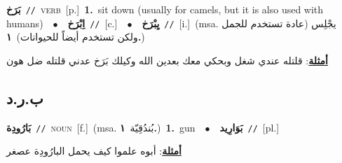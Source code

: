 \documentclass[10pt,a4paper,twoside]{article} %
\begin{document}
\begin{multicols}{2}
{\setlength\topsep{0pt}\textbf{\foreignlanguage{arabic}{بَرَخ}}\ {\color{gray}\texttt{//}\color{black}}\ \textsc{verb}\ [p.]\ \textbf{1.}~sit down (usually for camels, but it is also used with humans)\ \ $\bullet$\ \ \setlength\topsep{0pt}\textbf{\foreignlanguage{arabic}{اِبْرَخ}}\ {\color{gray}\texttt{//}\color{black}}\ [c.]\ \ $\bullet$\ \ \setlength\topsep{0pt}\textbf{\foreignlanguage{arabic}{يِبْرَخ}}\ {\color{gray}\texttt{//}\color{black}}\ [i.]\ \color{gray}(msa. \foreignlanguage{arabic}{يجْلِس (عادة تستخدم للجمل ولكن تستخدم أيضاً للحيوانات)}~\foreignlanguage{arabic}{\textbf{١.}})\color{black}\  \begin{flushright}\color{gray}\foreignlanguage{arabic}{\textbf{\underline{\foreignlanguage{arabic}{أمثلة}}}: قلتله عندي شغل وبحكي معك بعدين الله وكيلك بَرَخ عدني قلتله ضل هون}\end{flushright}\color{black}} \vspace{2mm}

\vspace{-3mm}
\subsection*{\color{blue}\foreignlanguage{arabic}{ب.ر.د}\color{blue}{}} 

{\setlength\topsep{0pt}\textbf{\foreignlanguage{arabic}{بَارُودِة}}\ {\color{gray}\texttt{//}\color{black}}\ \textsc{noun}\ [f.]\ \color{gray}(msa. \foreignlanguage{arabic}{بُندُقِيّة}~\foreignlanguage{arabic}{\textbf{١.}})\color{black}\ \textbf{1.}~gun\ \ $\bullet$\ \ \setlength\topsep{0pt}\textbf{\foreignlanguage{arabic}{بَوَارِيد}}\ {\color{gray}\texttt{//}\color{black}}\ [pl.]\  \begin{flushright}\color{gray}\foreignlanguage{arabic}{\textbf{\underline{\foreignlanguage{arabic}{أمثلة}}}: أبوه علموا كيف يحمل البارُودِة عصغر}\end{flushright}\color{black}} \vspace{2mm}


\end{multicols}
\end{document}
